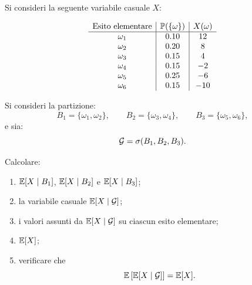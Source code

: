 \begin{exercise}
\label{ex:cap3-prop-condizionato-sigma-algebra}
\par\smallskip

Si consideri la seguente variabile casuale $X$:

\[
\begin{array}{c|c|c}
\text{Esito elementare} & \mathbb{P}(\{\omega\}) & X(\omega) \\
\hline
\omega_1 & 0.10 & 12 \\
\omega_2 & 0.20 & 8 \\
\omega_3 & 0.15 & 4 \\
\omega_4 & 0.15 & -2 \\
\omega_5 & 0.25 & -6 \\
\omega_6 & 0.15 & -10 \\
\end{array}
\]

Si consideri la partizione:
\[
B_1=\{\omega_1,\omega_2\},
\qquad
B_2=\{\omega_3,\omega_4\},
\qquad
B_3=\{\omega_5,\omega_6\},
\]
e sia:
\[
\mathcal{G}
=
\sigma(B_1,B_2,B_3).
\]

Calcolare:

\begin{enumerate}
    \item $\mathbb{E}[X\mid B_1]$,
    $\mathbb{E}[X\mid B_2]$ e $\mathbb{E}[X\mid B_3]$;

    \item la variabile casuale $\mathbb{E}[X\mid\mathcal{G}]$;

    \item i valori assunti da $\mathbb{E}[X\mid\mathcal{G}]$ su ciascun
    esito elementare;

    \item $\mathbb{E}[X]$;

    \item verificare che
    \[
    \mathbb{E}\left[
    \mathbb{E}[X\mid\mathcal{G}]
    \right]
    =
    \mathbb{E}[X].
    \]
\end{enumerate}

\end{exercise}

